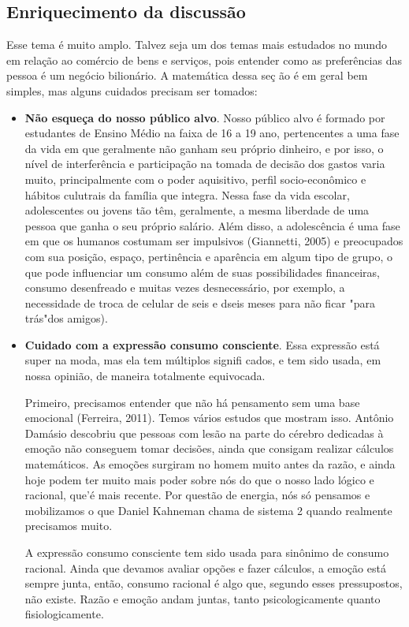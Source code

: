 \begin{paginatexto2}
\section*{Enriquecimento da discussão}

Esse tema é muito amplo. Talvez seja um dos temas mais estudados no mundo em relação ao comércio de bens e serviços, pois entender como as preferências das pessoa é um negócio bilionário. A matemática dessa seç ão é em geral bem simples, mas alguns cuidados precisam ser tomados:


\begin{itemize}
   \item \textbf{Não esqueça do nosso público alvo}. Nosso público alvo é formado por estudantes de Ensino Médio na faixa de 16 a 19 ano, pertencentes a uma fase da vida em que geralmente não ganham seu próprio dinheiro, e por isso, o nível de interferência e participação na tomada de decisão dos gastos varia muito, principalmente com o poder aquisitivo, perfil socio-econômico e hábitos culutrais da família que integra. Nessa fase da vida escolar, adolescentes ou jovens tão têm, geralmente, a mesma liberdade de uma pessoa que ganha o seu próprio salário. Além disso, a adolescência é uma fase em que os humanos costumam ser impulsivos (Giannetti, 2005) e preocupados com sua posição, espaço, pertinência e aparência em algum tipo de grupo, o que pode influenciar um consumo além de suas possibilidades financeiras, consumo desenfreado e muitas vezes desnecessário, por exemplo, a necessidade de troca de celular de seis e dseis meses para não ficar "para trás"{}dos amigos).

   \item\textbf{Cuidado com a expressão consumo consciente}. Essa expressão está super na moda, mas ela tem múltiplos signifi cados, e tem sido usada, em nossa opinião, de maneira totalmente equivocada.

   Primeiro, precisamos entender que não há pensamento sem uma base emocional (Ferreira, 2011). Temos vários estudos que mostram isso. Antônio Damásio descobriu que pessoas com lesão na parte do cérebro dedicadas à emoção não conseguem tomar decisões, ainda que consigam realizar cálculos matemáticos. As emoções surgiram no homem muito antes da razão, e ainda hoje podem ter muito mais poder sobre nós do que o nosso lado lógico e racional, que'é mais recente. Por questão de energia, nós só pensamos e mobilizamos o que Daniel Kahneman chama de sistema 2 quando realmente precisamos muito.

   A expressão consumo consciente tem sido usada para sinônimo de consumo racional. Ainda que devamos avaliar opções e fazer cálculos, a emoção está sempre junta, então, consumo racional é algo que, segundo esses pressupostos, não existe. Razão e emoção andam juntas, tanto psicologicamente quanto fisiologicamente.


\end{itemize}
\end{paginatexto2}
